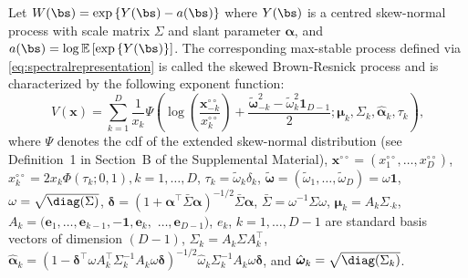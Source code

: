 \documentclass[12pt]{article}
\begin{document}
\begin{theorem}
\label{thm:skewBR}
Let $W(\bs) = \exp \left\{ Y(\bs) - a(\bs)\right\}$ where $Y(\bs)$ is a centred skew-normal process with scale matrix $\Sigma$ and slant parameter $\bm \alpha$, and $a(\bs) = \log \mathbb{E} \left[ \exp\left\{ Y(\bs) \right\}\right]$.
The corresponding max-stable process defined via \eqref{eq:spectralrepresentation} is called the skewed Brown-Resnick process and is characterized by the following exponent function:
%
\begin{equation}
\label{eq:V_skBR}
V(\bm x) =\sum_{k=1}^D \frac{1}{x_k} 
\Psi \left(\log \left( \frac{\bm x^{\circ\circ}_{-k}}{x^{\circ\circ}_k} \right) + \frac{\tilde{\bm \omega}_{-k}^2 - \tilde{\omega}_k^2 \bm 1_{D-1}}{2} ; \bm \mu_k, \Sigma_k, \hat{\bm \alpha}_k, \tau_k \right),
\end{equation}
%
where $\Psi$ denotes the cdf of the extended skew-normal distribution (see Definition~1 in Section~B of the Supplemental Material),
$\bm x^{\circ\circ} = \left( x^{\circ\circ}_1, \ldots, x^{\circ\circ}_D\right)$, 
$x^{\circ\circ}_k = 2x_k \Phi\left( \tau_k; 0, 1 \right), k=1, \ldots, D$, 
$\tau_k = \tilde{\omega}_k \delta_k$, $\tilde{\bm \omega} = \left( \tilde{\omega}_1, \ldots, \tilde{ \omega}_D\right) = \omega \bm 1$, $\omega = \sqrt{\diag(\Sigma)}$, 
$\bm \delta = \left( 1 + \bm \alpha^\top \bar{\Sigma} \bm \alpha\right)^{-1/2}\bar{\Sigma} \bm \alpha$, 
$\bar{\Sigma} = \omega^{-1} \Sigma \omega$,
$\bm\mu_k = A_k \Sigma_{\cdot k}$, 
$A_k = (\bm e_1, \ldots,\bm e_{k-1}, -\bm 1,\bm e_{k},$ $\ldots,\bm e_{D-1})$, 
$e_k$, $k=1, \ldots, D-1$ are standard basis vectors of dimension $(D-1)$, 
$\Sigma_k = A_k \Sigma A_k^\top$, 
$\hat{\bm\alpha}_k = \left(1-\bm\delta^\top \omega A_k^\top\Sigma_k^{-1} A_k \omega\bm\delta \right)^{-1/2} \hat{ \omega}_k\Sigma_k^{-1}A_k \omega\bm\delta$, 
and $\hat{\bm \omega}_k = \sqrt{\diag(\Sigma_k)}$.
\end{theorem}
\end{document}
